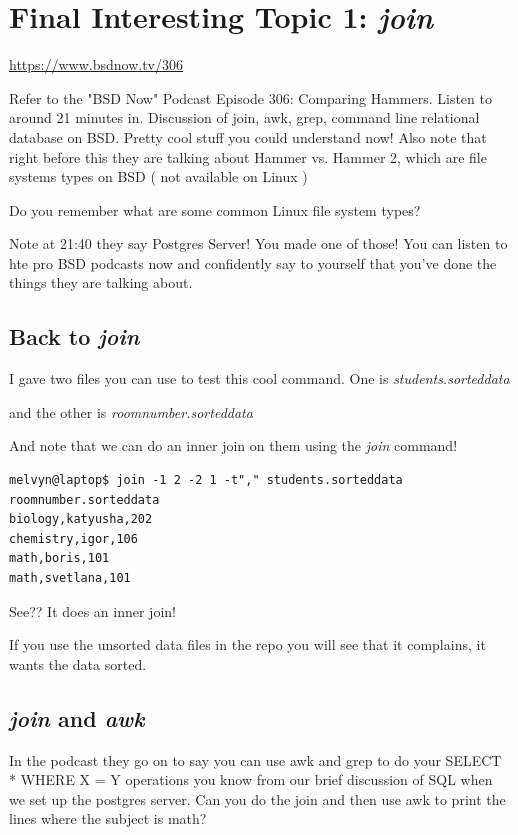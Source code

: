 \documentclass[10pt]{article}
\begin{document}
\section{Final Interesting Topic 1: \textit{join}}

\begin{center}
\url{https://www.bsdnow.tv/306}
\end{center}

Refer to the "BSD Now" Podcast Episode 306: Comparing Hammers. Listen to around
21 minutes in. Discussion of join, awk, grep, command line relational database
on BSD. Pretty cool stuff you could understand now! Also note that right before
this they are talking about Hammer vs. Hammer 2, which are file systems types on
BSD ( not available on Linux )

Do you remember what are some common Linux file system types?

Note at 21:40 they say Postgres Server! You made one of those! You can listen to
hte pro BSD podcasts now and confidently say to yourself that you've done the
things they are talking about.

\subsection{Back to \textit{join}}
I gave two files you can use to test this cool command. One is
\textit{students.sorteddata}



and the other is \textit{roomnumber.sorteddata}



And note that we can do an inner join on them using the \textit{join} command!

\begin{lstlisting}
melvyn@laptop$ join -1 2 -2 1 -t"," students.sorteddata roomnumber.sorteddata
biology,katyusha,202
chemistry,igor,106
math,boris,101
math,svetlana,101
\end{lstlisting}

See?? It does an inner join!

If you use the unsorted data files in the repo you will see that it complains,
it wants the data sorted.

\subsection{\textit{join} and \textit{awk}}
In the podcast they go on to say you can use awk and grep to do your SELECT *
WHERE X = Y operations you know from our brief discussion of SQL when we set up
the postgres server. Can you do the join and then use awk to print the lines
where the subject is math?
\end{document}
